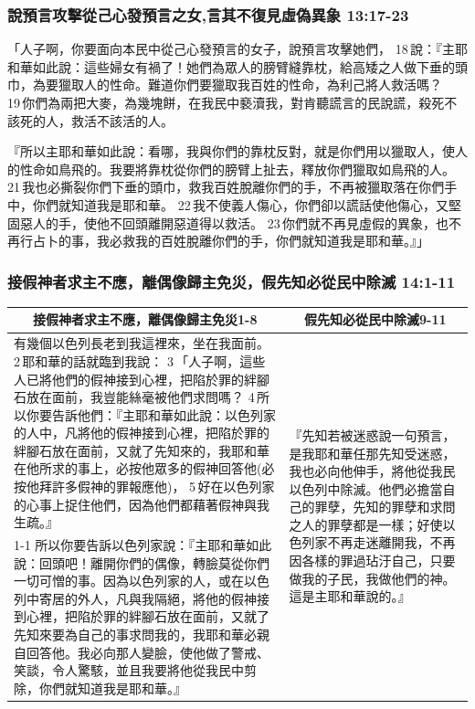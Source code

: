 \subsubsection{說預言攻擊從己心發預言之女,言其不復見虛偽異象 13:17-23}
「人子啊，你要面向本民中從己心發預言的女子，說預言攻擊她們， 18 說：『主耶和華如此說：這些婦女有禍了！她們為眾人的膀臂縫靠枕，給高矮之人做下垂的頭巾，為要獵取人的性命。難道你們要獵取我百姓的性命，為利己將人救活嗎？ 19 你們為兩把大麥，為幾塊餅，在我民中褻瀆我，對肯聽謊言的民說謊，殺死不該死的人，救活不該活的人。

『所以主耶和華如此說：看哪，我與你們的靠枕反對，就是你們用以獵取人，使人的性命如鳥飛的。我要將靠枕從你們的膀臂上扯去，釋放你們獵取如鳥飛的人。 21 我也必撕裂你們下垂的頭巾，救我百姓脫離你們的手，不再被獵取落在你們手中，你們就知道我是耶和華。 22 我不使義人傷心，你們卻以謊話使他傷心，又堅固惡人的手，使他不回頭離開惡道得以救活。 23 你們就不再見虛假的異象，也不再行占卜的事，我必救我的百姓脫離你們的手，你們就知道我是耶和華。』」

\subsubsection{接假神者求主不應，離偶像歸主免災，假先知必從民中除滅 14:1-11}
\begin{table}[H]
\centering
\begin{tabular}{p{13.5cm}|p{4.0cm}}\hline\hline
\multicolumn{1}{c|}{接假神者求主不應，離偶像歸主免災1-8}&\multicolumn{1}{c}{假先知必從民中除滅9-11}\\\hline
有幾個以色列長老到我這裡來，坐在我面前。 2 耶和華的話就臨到我說： 3 「人子啊，這些人已將他們的假神接到心裡，把陷於罪的絆腳石放在面前，我豈能絲毫被他們求問嗎？ 4 所以你要告訴他們：『主耶和華如此說：以色列家的人中，凡將他的假神接到心裡，把陷於罪的絆腳石放在面前，又就了先知來的，我耶和華在他所求的事上，必按他眾多的假神回答他(必按他拜許多假神的罪報應他)， 5 好在以色列家的心事上捉住他們，因為他們都藉著假神與我生疏。』
&\multirow{2}{4.2cm}{『先知若被迷惑說一句預言，是我耶和華任那先知受迷惑，我也必向他伸手，將他從我民以色列中除滅。他們必擔當自己的罪孽，先知的罪孽和求問之人的罪孽都是一樣；好使以色列家不再走迷離開我，不再因各樣的罪過玷汙自己，只要做我的子民，我做他們的神。這是主耶和華說的。』}\\\cline{1-1}
所以你要告訴以色列家說：『主耶和華如此說：回頭吧！離開你們的偶像，轉臉莫從你們一切可憎的事。因為以色列家的人，或在以色列中寄居的外人，凡與我隔絕，將他的假神接到心裡，把陷於罪的絆腳石放在面前，又就了先知來要為自己的事求問我的，我耶和華必親自回答他。我必向那人變臉，使他做了警戒、笑談，令人驚駭，並且我要將他從我民中剪除，你們就知道我是耶和華。』&\\\hline
\end{tabular}
\end{table}


